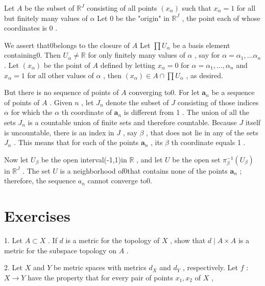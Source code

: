 Let \(A\) be the subset of \({\mathbb{R}}^{J}\) consisting of all points \(\left( {x}_{\alpha }\right)\) such that \({x}_{\alpha } = 1\) for all but finitely many values of \(\alpha\) Let 0 be the "origin" in \({\mathbb{R}}^{J}\) , the point each of whose coordinates is 0 .

We assert that0belongs to the closure of \(A\) Let \(\prod {U}_{\alpha }\) be a basis element containing0. Then \({U}_{\alpha } \neq  \mathbb{R}\) for only finitely many values of \(\alpha\) , say for \(\alpha  = {\alpha }_{1},\ldots {\alpha }_{n}\) . Let \(\left( {x}_{\alpha }\right)\) be the point of \(A\) defined by letting \({x}_{\alpha } = 0\) for \(\alpha  = {\alpha }_{1},\ldots ,{\alpha }_{n}\) and \({x}_{\alpha } = 1\) for all other values of \(\alpha\) , then \(\left( {x}_{\alpha }\right)  \in  A \cap  \prod {U}_{\alpha }\) , as desired.

But there is no sequence of points of \(A\) converging to0. For let \({\mathbf{a}}_{n}\) be a sequence of points of \(A\) . Given \(n\) , let \({J}_{n}\) denote the subset of \(J\) consisting of those indices \(\alpha\) for which the \(\alpha\) th coordinate of \({\mathbf{a}}_{n}\) is different from 1 . The union of all the sets \({J}_{n}\) is a countable union of finite sets and therefore countable. Because \(J\) itself is uncountable, there is an index in \(J\) , say \(\beta\) , that does not lie in any of the sets \({J}_{n}\) . This means that for each of the points \({\mathbf{a}}_{n}\) , its \(\beta\) th coordinate equals 1 .

Now let \({U}_{\beta }\) be the open interval(-1,1)in \(\mathbb{R}\) , and let \(U\) be the open set \({\pi }_{\beta }^{-1}\left( {U}_{\beta }\right)\) in \({\mathbb{R}}^{J}\) . The set \(U\) is a neighborhood of0that contains none of the points \({\mathbf{a}}_{n}\) ; therefore, the sequence \({a}_{n}\) cannot converge to0.

\section*{Exercises}

1. Let \(A \subset  X\) . If \(d\) is a metric for the topology of \(X\) , show that \(d \mid  A \times  A\) is a metric for the subspace topology on \(A\) .

2. Let \(X\) and \(Y\) be metric spaces with metrics \({d}_{X}\) and \({d}_{Y}\) , respectively. Let \(f\) : \(X \rightarrow  Y\) have the property that for every pair of points \({x}_{1},{x}_{2}\) of \(X\) ,

